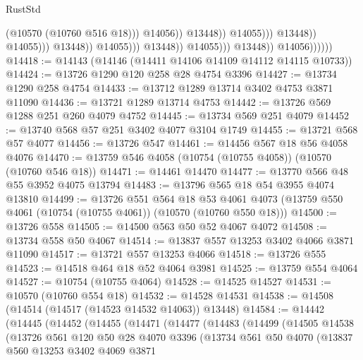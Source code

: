 \begin{lexlean}{RustStd}
\begin{coremodule}
                                                                  (@10570 (@10760 @516 @18)))
                                                                @14056))
                                                            @13448))
                                                        @14055)))
                                                  @13448))
                                              @14055)))
                                        @13448))
                                    @14055)))
                              @13448))
                          @14055)))
                    @13448))
                @14056))))))
@14418 := @14143 (@14146 (@14411 @14106 @14109 @14112 @14115 @10733))
@14424 := @13726 @1290 @120 @258 @28 @4754 @3396
@14427 := @13734 @1290 @258 @4754
@14433 := @13712 @1289 @13714 @3402 @4753 @3871 @11090
@14436 := @13721 @1289 @13714 @4753
@14442 := @13726 @569 @1288 @251 @260 @4079 @4752
@14445 := @13734 @569 @251 @4079
@14452 := @13740 @568 @57 @251 @3402 @4077 @3104 @1749
@14455 := @13721 @568 @57 @4077
@14456 := @13726 @547
@14461 := @14456 @567 @18 @56 @4058 @4076
@14470 := @13759 @546 @4058 (@10754 (@10755 @4058)) (@10570 (@10760 @546 @18))
@14471 := @14461 @14470
@14477 := @13770 @566 @48 @55 @3952 @4075 @13794
@14483 := @13796 @565 @18 @54 @3955 @4074 @13810
@14499 := @13726
    @551
    @564
    @18
    @53
    @4061
    @4073
    (@13759 @550 @4061 (@10754 (@10755 @4061)) (@10570 (@10760 @550 @18)))
@14500 := @13726 @558
@14505 := @14500 @563 @50 @52 @4067 @4072
@14508 := @13734 @558 @50 @4067
@14514 := @13837 @557 @13253 @3402 @4066 @3871 @11090
@14517 := @13721 @557 @13253 @4066
@14518 := @13726 @555
@14523 := @14518 @464 @18 @52 @4064 @3981
@14525 := @13759 @554 @4064
@14527 := @10754 (@10755 @4064)
@14528 := @14525 @14527
@14531 := @10570 (@10760 @554 @18)
@14532 := @14528 @14531
@14538 := @14508 (@14514 (@14517 (@14523 @14532 @14063)) @13448)
@14584 := @14442
    (@14445
      (@14452
        (@14455
          (@14471
            (@14477
              (@14483
                (@14499
                  (@14505
                    @14538
                    (@13726
                      @561
                      @120
                      @50
                      @28
                      @4070
                      @3396
                      (@13734
                        @561
                        @50
                        @4070
                        (@13837
                          @560
                          @13253
                          @3402
                          @4069
                          @3871

\end{coremodule}
\end{lexlean}
